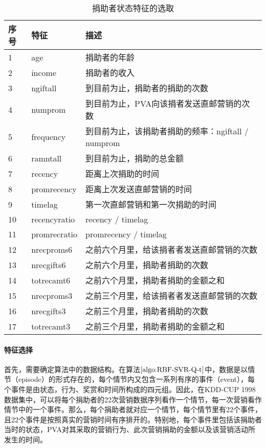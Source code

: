 \begin{table}[htbp]
  \centering
  \caption{捐助者状态特征的选取}
  \label{tab:obser_donors}
  \begin{tabular}{lll}
    \toprule
      序号 & 特征 & 描述 \\
    \midrule
      1 & age & 捐助者的年龄 \\
      2 &income & 捐助者的收入 \\
      3 &ngiftall & 到目前为止，捐助者的捐助的次数 \\
      4 &numprom & 到目前为止，PVA向该捐者发送直邮营销的次数 \\
      5 &frequency & 到目前为止，该捐助者捐助的频率：ngiftall / numprom \\
      6 &ramntall & 到目前为止，捐助的总金额 \\
      7 &recency & 距离上次捐助的时间 \\
      8 &promrecency & 距离上次发送直邮营销的时间\\
      9 &timelag & 第一次直邮营销和第一次捐助的时间\\
      10 &recencyratio & recency / timelag\\
	  11 &promrecratio & promrecency / timelag\\
      12 &nrecproms6 & 之前六个月里，给该捐者者发送直邮营销的次数\\
      13 &nrecgifts6 & 之前六个月里，捐助者捐助的次数\\
      14 &totrecamt6 & 之前六个月里，捐助者捐助的金额之和\\ 
      15 &nrecproms3 & 之前三个月里，给该捐者者发送直邮营销的次数\\
      16 &nrecgifts3 & 之前三个月里，捐助者捐助的次数\\
      17 &totrecamt3 & 之前三个月里，捐助者捐助的金额之和\\            	  
    \bottomrule
  \end{tabular}
\end{table}

\paragraph{特征选择}
首先，需要确定算法中的数据结构。在算法$\ref{algo:RBF-SVR-Q-t}$中，数据是以情节（episode）的形式存在的，每个情节内又包含一系列有序的事件（event），每个事件是由状态，行为、奖赏和时间所构成的四元组。因此，在KDD-CUP 1998数据集中，可以将每个捐助者的22次营销数据序列看作一个情节，每一次营销看作情节中的一个事件。那么，每个捐助者就对应一个情节，每个情节里有22个事件，且22个事件是按照真实的营销时间有序排开的。特别地，每个事件里包括该捐助者当时的状态，PVA对其采取的营销行为、此次营销捐助的金额以及该营销活动所发生的时间。

